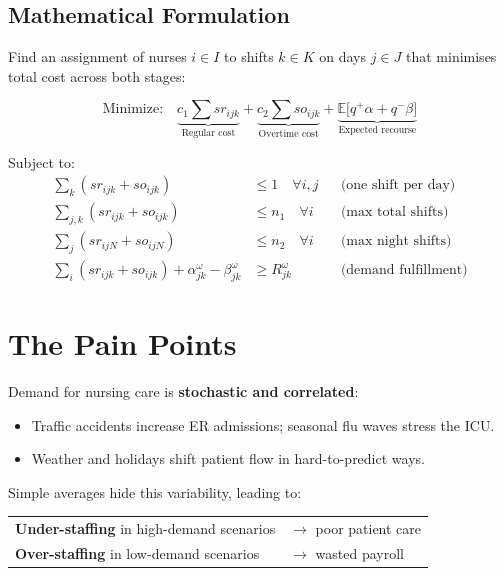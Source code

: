 \documentclass[12pt,a4paper]{article}
\begin{document}
\subsection{Mathematical Formulation}

Find an assignment of nurses $i \in I$ to shifts $k \in K$ on days $j \in J$ that minimises total cost across both stages:

\begin{eqbox}
\begin{equation}
\text{Minimize:}\quad
\underbrace{c_1 \textstyle\sum sr_{ijk}}_{\text{Regular cost}}
+\underbrace{c_2 \textstyle\sum so_{ijk}}_{\text{Overtime cost}}
+\underbrace{\mathbb{E}\bigl[q^{+}\alpha + q^{-}\beta\bigr]}_{\text{Expected recourse}}
\end{equation}
\end{eqbox}

\noindent Subject to:
\begin{align}
  \sum_k (sr_{ijk}+so_{ijk}) &\leq 1 \quad \forall i,j
    && \text{(one shift per day)}\\
  \sum_{j,k}(sr_{ijk}+so_{ijk}) &\leq n_1 \quad \forall i
    && \text{(max total shifts)}\\
  \sum_j(sr_{ijN}+so_{ijN}) &\leq n_2 \quad \forall i
    && \text{(max night shifts)}\\
  \sum_i(sr_{ijk}+so_{ijk}) + \alpha_{jk}^{\omega} - \beta_{jk}^{\omega}
    &\geq R_{jk}^{\omega}
    && \text{(demand fulfillment)}
\end{align}

\newpage
\section{The Pain Points}

\begin{problembox}
Demand for nursing care is \textbf{stochastic and correlated}:
\begin{itemize}[itemsep=2pt]
  \item Traffic accidents increase ER admissions; seasonal flu waves stress the ICU.
  \item Weather and holidays shift patient flow in hard-to-predict ways.
\end{itemize}
Simple averages hide this variability, leading to:\\[4pt]
\begin{tabular}{@{}ll@{}}
  \textcolor{accentred}{\textbf{Under-staffing}} in high-demand scenarios & $\rightarrow$ poor patient care\\
  \textcolor{accentorange}{\textbf{Over-staffing}} in low-demand scenarios & $\rightarrow$ wasted payroll
\end{tabular}
\end{problembox}
\end{document}
